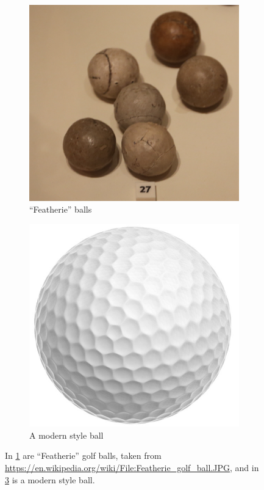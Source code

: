 \begin{figure}[h]
\centering
\begin{subfigure}[b]{0.4\textwidth}
\includegraphics[scale=0.16]{../images/featherie.jpg}
\caption{``Featherie'' balls}
\label{im:featherie}
\end{subfigure}
\quad \quad \quad \quad
\begin{subfigure}[b]{0.4\textwidth}
\includegraphics[scale=0.48]{../images/golf-itemno-12.jpg}
\caption{A modern style ball}
\label{im:pv1}
\end{subfigure}
\caption[Images of golf balls]{In \ref{im:featherie} are ``Featherie'' golf balls, taken from 
\url{https://en.wikipedia.org/wiki/File:Featherie_golf_ball.JPG}, 
and in \ref{im:pv1} is a modern style ball.}
\end{figure}

